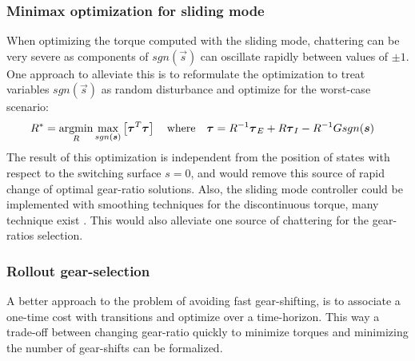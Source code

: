 \subsubsection{Minimax optimization for sliding mode}

When optimizing the torque computed with the sliding mode, chattering can be very severe as components of $sgn( \vec{s} )$ can oscillate rapidly between values of $\pm1$. One approach to alleviate this is to reformulate the optimization to treat variables $sgn( \vec{s} )$ as random disturbance and optimize for the worst-case scenario:
%
\begin{align}
R^{*} &= \operatornamewithlimits{argmin}\limits_{R} \operatornamewithlimits{max}\limits_{sgn(\vec{s})} \left[ \vec{\tau}^T\vec{\tau}  \right] \quad\text{where}\quad \vec{\tau} = R^{-1} \vec{\tau}_{E} + R \vec{\tau}_{I} - R^{-1} G sgn( \vec{s} ) 
\end{align} 
%
The result of this optimization is independent from the position of states with respect to the switching surface $s=0$, and would remove this source of rapid change of optimal gear-ratio solutions. Also, the sliding mode controller could be implemented with smoothing techniques for the discontinuous torque, many technique exist \cite{slotine_applied_1991} \cite{perruquetti_sliding_2002}. This would also alleviate one source of chattering for the gear-ratios selection.

\subsubsection{Rollout gear-selection}

A better approach to the problem of avoiding fast gear-shifting, is to associate a one-time cost with transitions and optimize over a time-horizon. This way a trade-off between changing gear-ratio quickly to minimize torques and minimizing the number of gear-shifts can be formalized.


